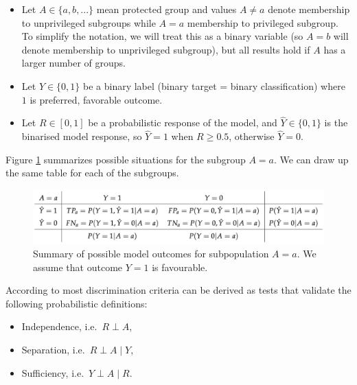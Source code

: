 \begin{itemize}
\tightlist
\item
  Let \(A \in \{a,b, ...\}\) mean protected group and values
  \(A \neq a\) denote membership to unprivileged subgroups while
  \(A = a\) membership to privileged subgroup. To simplify the notation,
  we will treat this as a binary variable (so \(A = b\) will denote
  membership to unprivileged subgroup), but all results hold if \(A\)
  has a larger number of groups.\\
\item
  Let \(Y \in \{0,1\}\) be a binary label (binary target = binary
  classification) where \(1\) is preferred, favorable outcome.
\item
  Let \(R \in [0,1]\) be a probabilistic response of the model, and
  \(\hat{Y} \in \{0,1\}\) is the binarised model response, so
  \(\hat{Y} = 1\) when \(R \geq 0.5\), otherwise \(\hat{Y} = 0\).
\end{itemize}

Figure \ref{fig:fairnessTable1} summarizes possible situations for the
subgroup \(A=a\). We can draw up the same table for each of the
subgroups.

\begin{figure}

{\centering \includegraphics[width=1\linewidth]{table1} 

}

\caption[Summary of possible model outcomes for subpopulation $A = a$]{Summary of possible model outcomes for subpopulation $A = a$. We assume that outcome $Y = 1$ is favourable.}\label{fig:fairnessTable1}
\end{figure}

According to \citet{barocas-hardt-narayanan} most discrimination
criteria can be derived as tests that validate the following
probabilistic definitions:

\begin{itemize}
\tightlist
\item
  Independence, i.e.~\(R \perp A\),
\item
  Separation, i.e.~\(R \perp A \mid Y\),
\item
  Sufficiency, i.e.~\(Y \perp A \mid R\).
\end{itemize}


